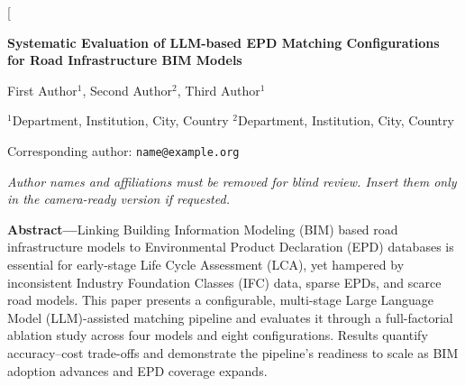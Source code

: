 \documentclass[10pt, a4paper, twocolumn]{article}
\begin{document}

\twocolumn[{%
\begin{@twocolumnfalse}

  \begin{center}

    {\Large\bfseries
      Systematic Evaluation of LLM-based EPD Matching Configurations for Road Infrastructure BIM Models 
    \par}

    \vspace{10pt}

    {\normalsize
      First Author$^{1}$,
      Second Author$^{2}$,
      Third Author$^{1}$
    \par}

    \vspace{4pt}

    {\small
      $^{1}$Department, Institution, City, Country\quad
      $^{2}$Department, Institution, City, Country
    \par}

    \vspace{2pt}

    {\small Corresponding author: \texttt{name@example.org} \par}

    \vspace{2pt}

    {\small\itshape
      Author names and affiliations must be removed for blind review.
      Insert them only in the camera-ready version if requested.
    \par}

  \end{center}

  \vspace{8pt}

  \noindent\textbf{Abstract}\textbf{---}Linking Building Information Modeling (BIM) based road infrastructure models to Environmental Product Declaration (EPD) databases is essential for early-stage Life Cycle Assessment (LCA), yet hampered by inconsistent Industry Foundation Classes (IFC) data, sparse EPDs, and scarce road models. This paper presents a configurable, multi-stage Large Language Model (LLM)-assisted matching pipeline and evaluates it through a full-factorial ablation study across four models and eight configurations. Results quantify accuracy–cost trade-offs and demonstrate the pipeline’s readiness to scale as BIM adoption advances and EPD coverage expands. 


\end{@twocolumnfalse}}
\end{document}
